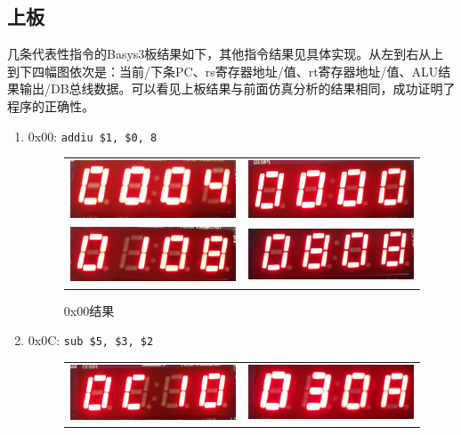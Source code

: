 \documentclass[12pt,UTF8]{ctexart}
\begin{document}
\begin{spacing}{1.1}
\subsection{上板}
\qquad 几条代表性指令的Basys3板结果如下，其他指令结果见具体实现。从左到右从上到下四幅图依次是：当前/下条PC、rs寄存器地址/值、rt寄存器地址/值、ALU结果输出/DB总线数据。可以看见上板结果与前面仿真分析的结果相同，成功证明了程序的正确性。
\begin{enumerate}
    \item 0x00: \verb'addiu $1, $0, 8'
    \begin{figure}[H]
    \centering
    \begin{tabular}{cc}
    \includegraphics[width=0.3\linewidth]{fig/Implementation/0x00_00.jpg}&
    \includegraphics[width=0.3\linewidth]{fig/Implementation/0x00_01.jpg}\\
    \includegraphics[width=0.3\linewidth]{fig/Implementation/0x00_10.jpg}&
    \includegraphics[width=0.3\linewidth]{fig/Implementation/0x00_11.jpg}
    \end{tabular}
    \caption{0x00结果}
    \end{figure}
    \item 0x0C: \verb'sub $5, $3, $2'
    \begin{figure}[H]
    \centering
    \begin{tabular}{cc}
    \includegraphics[width=0.3\linewidth]{fig/Implementation/0x0c_00.jpg}&
    \includegraphics[width=0.3\linewidth]{fig/Implementation/0x0c_01.jpg}\\

\end{tabular}
\end{figure}
\end{enumerate}
\end{spacing}
\end{document}
